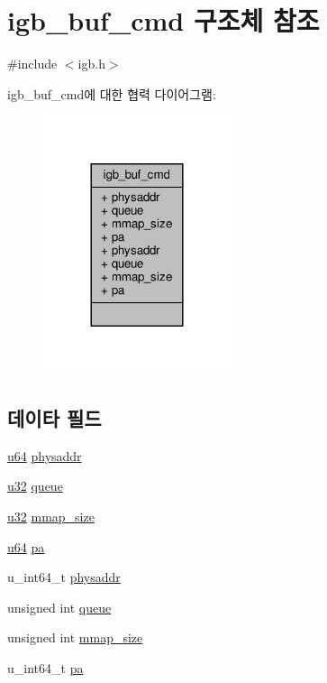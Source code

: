 \hypertarget{structigb__buf__cmd}{}\section{igb\+\_\+buf\+\_\+cmd 구조체 참조}
\label{structigb__buf__cmd}


{\ttfamily \#include $<$igb.\+h$>$}



igb\+\_\+buf\+\_\+cmd에 대한 협력 다이어그램\+:
\nopagebreak
\begin{figure}[H]
\begin{center}
\leavevmode
\includegraphics[width=156pt]{structigb__buf__cmd__coll__graph}
\end{center}
\end{figure}
\subsection*{데이타 필드}
\begin{DoxyCompactItemize}
\item 
\hyperlink{lib_2igb_2e1000__osdep_8h_a1d8f78f95a414480659f3182e6067b80}{u64} \hyperlink{structigb__buf__cmd_a49f357a5ff181876b6c641e455b18b20}{physaddr}
\item 
\hyperlink{lib_2igb_2e1000__osdep_8h_a64e91c10a0d8fb627e92932050284264}{u32} \hyperlink{structigb__buf__cmd_a6be361df991687a3b78645e3e8fa853d}{queue}
\item 
\hyperlink{lib_2igb_2e1000__osdep_8h_a64e91c10a0d8fb627e92932050284264}{u32} \hyperlink{structigb__buf__cmd_ac76710c49696b7df6ecbef456496ea50}{mmap\+\_\+size}
\item 
\hyperlink{lib_2igb_2e1000__osdep_8h_a1d8f78f95a414480659f3182e6067b80}{u64} \hyperlink{structigb__buf__cmd_a16daee3847fb6e540a1285a3951ff169}{pa}
\item 
u\+\_\+int64\+\_\+t \hyperlink{structigb__buf__cmd_a23da577f8e1a9164fc9c47cf626ae945}{physaddr}
\item 
unsigned int \hyperlink{structigb__buf__cmd_a333f8c12f7257468eb143bdd69f6ae80}{queue}
\item 
unsigned int \hyperlink{structigb__buf__cmd_a8258a70481ee5ece54c23de98e767611}{mmap\+\_\+size}
\item 
u\+\_\+int64\+\_\+t \hyperlink{structigb__buf__cmd_a20b4a811fcc92dd2921fb495678f70c9}{pa}
\end{DoxyCompactItemize}


